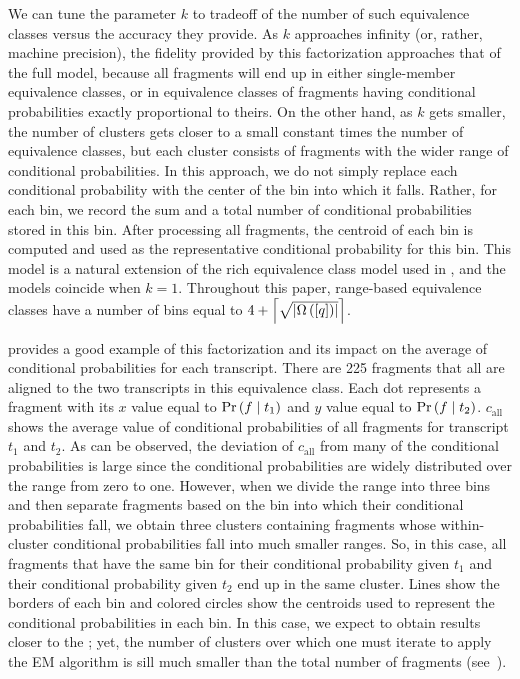 We can tune the parameter $k$ to tradeoff of the number of such equivalence classes versus 
the accuracy they provide. As $k$ approaches infinity (or, rather, machine precision), the 
fidelity provided by this factorization approaches that of the full model, because all 
fragments will end up in either single-member equivalence classes, or in equivalence classes 
of fragments having conditional probabilities exactly proportional to theirs. On the other 
hand, as $k$ gets smaller, the number of clusters gets closer to a small constant times the 
number of \cb equivalence classes, but each cluster consists of fragments with the wider 
range of conditional probabilities.  In this approach, we do not simply replace each 
conditional probability with the center of the bin into which it falls.  Rather, for 
each bin, we record the sum and a total number of conditional probabilities stored in 
this bin.  After processing all fragments, the centroid of each bin is computed and used 
as the representative conditional probability for this bin.  This model is a natural 
extension of the rich equivalence class model used in \salmon, and the models coincide 
when $k = 1$. Throughout this paper, range-based equivalence classes have a number of 
bins equal to $4 + \left\lceil \sqrt{\left|\Omega\left(\left[q\right]\right)\right|} \right\rceil$. 

 provides a good example of this factorization and its impact on 
the average of conditional probabilities for each transcript. There are 225 fragments 
that all are aligned to the two transcripts in this equivalence class. Each dot represents 
a fragment with its $x$ value equal to $\Prob{f}{t_1}$ and $y$ value equal to 
$\Prob{f}{t_2}$. $c_{\text{all}}$ shows the average value of conditional probabilities 
of all fragments for transcript $t_1$ and $t_2$. As can be observed, the deviation of 
$c_{\text{all}}$ from many of the conditional probabilities is large since the conditional 
probabilities are widely distributed over the range from zero to one. However, when we 
divide the range into three bins and then separate fragments based on the bin into which 
their conditional probabilities fall, we obtain three clusters containing fragments whose 
within-cluster conditional probabilities fall into much smaller ranges. So, in this case, 
all fragments that have the same bin for their conditional probability given $t_1$ and 
their conditional probability given $t_2$ end up in the same cluster. Lines show the 
borders of each bin and colored circles show the centroids used to represent the conditional 
probabilities in each bin. In this case, we expect to obtain results closer to the \fm; yet, 
the number of clusters over which one must iterate to apply the EM algorithm is sill much 
smaller than the total number of fragments (see~).

